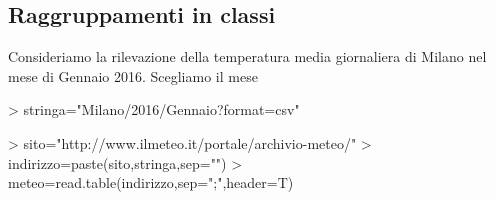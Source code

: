 \documentclass[onecolumn,12pt]{book}
\begin{document}
\subsection{Raggruppamenti in classi}
Consideriamo la rilevazione della temperatura media giornaliera di Milano nel mese di Gennaio 2016.
Scegliamo il mese
\begin{Schunk}
\begin{Soutput}
> stringa="Milano/2016/Gennaio?format=csv"
\end{Soutput}
\end{Schunk}
\begin{Schunk}
\begin{Sinput}
> sito="http://www.ilmeteo.it/portale/archivio-meteo/"
> indirizzo=paste(sito,stringa,sep="")
> meteo=read.table(indirizzo,sep=";",header=T)
\end{Sinput}
\end{Schunk}
\end{document}
